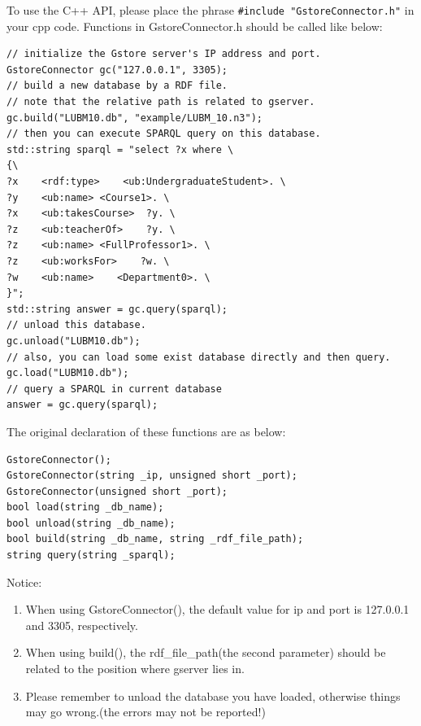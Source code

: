 \documentclass[titlepage, a4paper, 12pt]{article}
\begin{document}


To use the C++ API, please place the phrase
\texttt{\#include\ "GstoreConnector.h"} in your cpp code. Functions in
GstoreConnector.h should be called like below:

\begin{verbatim}
// initialize the Gstore server's IP address and port.
GstoreConnector gc("127.0.0.1", 3305);
// build a new database by a RDF file.
// note that the relative path is related to gserver.
gc.build("LUBM10.db", "example/LUBM_10.n3");
// then you can execute SPARQL query on this database.
std::string sparql = "select ?x where \
{\
?x    <rdf:type>    <ub:UndergraduateStudent>. \
?y    <ub:name> <Course1>. \
?x    <ub:takesCourse>  ?y. \
?z    <ub:teacherOf>    ?y. \
?z    <ub:name> <FullProfessor1>. \
?z    <ub:worksFor>    ?w. \
?w    <ub:name>    <Department0>. \
}";
std::string answer = gc.query(sparql);
// unload this database.
gc.unload("LUBM10.db");
// also, you can load some exist database directly and then query.
gc.load("LUBM10.db");
// query a SPARQL in current database
answer = gc.query(sparql);
\end{verbatim}

The original declaration of these functions are as below:

\begin{verbatim}
GstoreConnector();
GstoreConnector(string _ip, unsigned short _port);
GstoreConnector(unsigned short _port);
bool load(string _db_name);
bool unload(string _db_name);
bool build(string _db_name, string _rdf_file_path);
string query(string _sparql);
\end{verbatim}

Notice:

\begin{enumerate}
\item
  When using GstoreConnector(), the default value for ip and port is
  127.0.0.1 and 3305, respectively.
\item
  When using build(), the rdf\_file\_path(the second parameter) should
  be related to the position where gserver lies in.
\item
  Please remember to unload the database you have loaded, otherwise
  things may go wrong.(the errors may not be reported!)
\end{enumerate}
\end{document}

